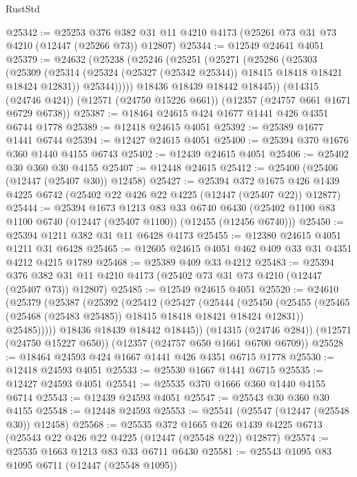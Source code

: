 \begin{lexlean}{RustStd}
\begin{coremodule}
@25342 := @25253
    @376
    @382
    @31
    @11
    @4210
    @4173
    (@25261 @73 @31 @73 @4210 (@12447 (@25266 @73)) @12807)
@25344 := @12549 @24641 @4051
@25379 := @24632
    (@25238
      (@25246
        (@25251
          (@25271
            (@25286
              (@25303
                (@25309
                  (@25314 (@25324 (@25327 (@25342 @25344)) @18415 @18418 @18421 @18424 @12831))
                  @25344)))))
        @18436
        @18439
        @18442
        @18445))
    (@14315 (@24746 @424))
    (@12571 (@24750 @15226 @661))
    (@12357 (@24757 @661 @1671 @6729 @6738))
@25387 := @18464 @24615 @424 @1677 @1441 @426 @4351 @6744 @1778
@25389 := @12418 @24615 @4051
@25392 := @25389 @1677 @1441 @6744
@25394 := @12427 @24615 @4051
@25400 := @25394 @370 @1676 @360 @1440 @4155 @6743
@25402 := @12439 @24615 @4051
@25406 := @25402 @30 @360 @30 @4155
@25407 := @12448 @24615
@25412 := @25400 (@25406 (@12447 (@25407 @30)) @12458)
@25427 := @25394
    @372
    @1675
    @426
    @1439
    @4225
    @6742
    (@25402 @22 @426 @22 @4225 (@12447 (@25407 @22)) @12877)
@25444 := @25394
    @1673
    @1213
    @83
    @33
    @6740
    @6430
    (@25402 @1100 @83 @1100 @6740 (@12447 (@25407 @1100)) (@12455 (@12456 @6740)))
@25450 := @25394 @1211 @382 @31 @11 @6428 @4173
@25455 := @12380 @24615 @4051 @1211 @31 @6428
@25465 := @12605 @24615 @4051 @462 @409 @33 @31 @4351 @4212 @4215 @1789
@25468 := @25389 @409 @33 @4212
@25483 := @25394
    @376
    @382
    @31
    @11
    @4210
    @4173
    (@25402 @73 @31 @73 @4210 (@12447 (@25407 @73)) @12807)
@25485 := @12549 @24615 @4051
@25520 := @24610
    (@25379
      (@25387
        (@25392
          (@25412
            (@25427
              (@25444
                (@25450
                  (@25455 (@25465 (@25468 (@25483 @25485)) @18415 @18418 @18421 @18424 @12831))
                  @25485)))))
        @18436
        @18439
        @18442
        @18445))
    (@14315 (@24746 @284))
    (@12571 (@24750 @15227 @650))
    (@12357 (@24757 @650 @1661 @6700 @6709))
@25528 := @18464 @24593 @424 @1667 @1441 @426 @4351 @6715 @1778
@25530 := @12418 @24593 @4051
@25533 := @25530 @1667 @1441 @6715
@25535 := @12427 @24593 @4051
@25541 := @25535 @370 @1666 @360 @1440 @4155 @6714
@25543 := @12439 @24593 @4051
@25547 := @25543 @30 @360 @30 @4155
@25548 := @12448 @24593
@25553 := @25541 (@25547 (@12447 (@25548 @30)) @12458)
@25568 := @25535
    @372
    @1665
    @426
    @1439
    @4225
    @6713
    (@25543 @22 @426 @22 @4225 (@12447 (@25548 @22)) @12877)
@25574 := @25535 @1663 @1213 @83 @33 @6711 @6430
@25581 := @25543 @1095 @83 @1095 @6711 (@12447 (@25548 @1095))

\end{coremodule}
\end{lexlean}
